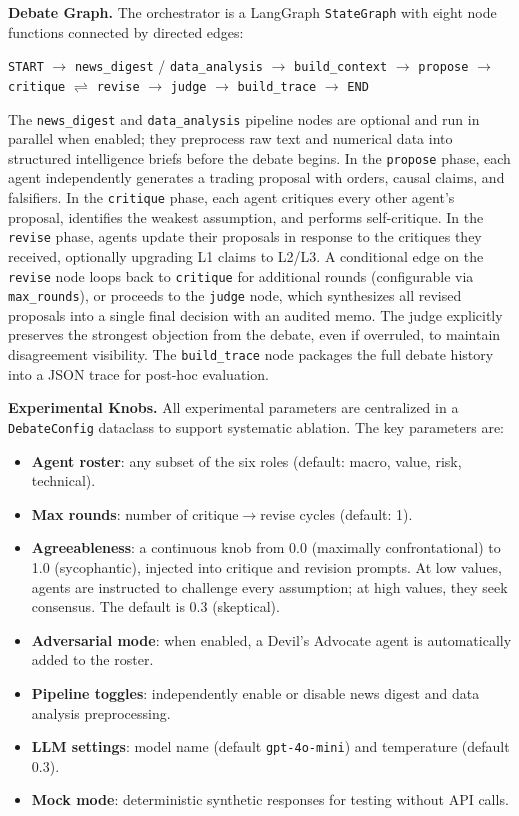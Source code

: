 \textbf{Debate Graph.}
The orchestrator is a LangGraph \texttt{StateGraph} with eight node functions connected by directed edges:

\begin{center}
\texttt{START} $\to$ \texttt{news\_digest} / \texttt{data\_analysis} $\to$ \texttt{build\_context} $\to$ \texttt{propose} $\to$ \texttt{critique} $\rightleftharpoons$ \texttt{revise} $\to$ \texttt{judge} $\to$ \texttt{build\_trace} $\to$ \texttt{END}
\end{center}

The \texttt{news\_digest} and \texttt{data\_analysis} pipeline nodes are optional and run in parallel when enabled; they preprocess raw text and numerical data into structured intelligence briefs before the debate begins. In the \texttt{propose} phase, each agent independently generates a trading proposal with orders, causal claims, and falsifiers. In the \texttt{critique} phase, each agent critiques every other agent's proposal, identifies the weakest assumption, and performs self-critique. In the \texttt{revise} phase, agents update their proposals in response to the critiques they received, optionally upgrading L1 claims to L2/L3. A conditional edge on the \texttt{revise} node loops back to \texttt{critique} for additional rounds (configurable via \texttt{max\_rounds}), or proceeds to the \texttt{judge} node, which synthesizes all revised proposals into a single final decision with an audited memo. The judge explicitly preserves the strongest objection from the debate, even if overruled, to maintain disagreement visibility. The \texttt{build\_trace} node packages the full debate history into a JSON trace for post-hoc evaluation.

\textbf{Experimental Knobs.}
All experimental parameters are centralized in a \texttt{DebateConfig} dataclass to support systematic ablation. The key parameters are:
\begin{itemize}
\setlength\itemsep{0pt}
  \item \textbf{Agent roster}: any subset of the six roles (default: macro, value, risk, technical).
  \item \textbf{Max rounds}: number of critique$\to$revise cycles (default: 1).
  \item \textbf{Agreeableness}: a continuous knob from 0.0 (maximally confrontational) to 1.0 (sycophantic), injected into critique and revision prompts. At low values, agents are instructed to challenge every assumption; at high values, they seek consensus. The default is 0.3 (skeptical).
  \item \textbf{Adversarial mode}: when enabled, a Devil's Advocate agent is automatically added to the roster.
  \item \textbf{Pipeline toggles}: independently enable or disable news digest and data analysis preprocessing.
  \item \textbf{LLM settings}: model name (default \texttt{gpt-4o-mini}) and temperature (default 0.3).
  \item \textbf{Mock mode}: deterministic synthetic responses for testing without API calls.
\end{itemize}

